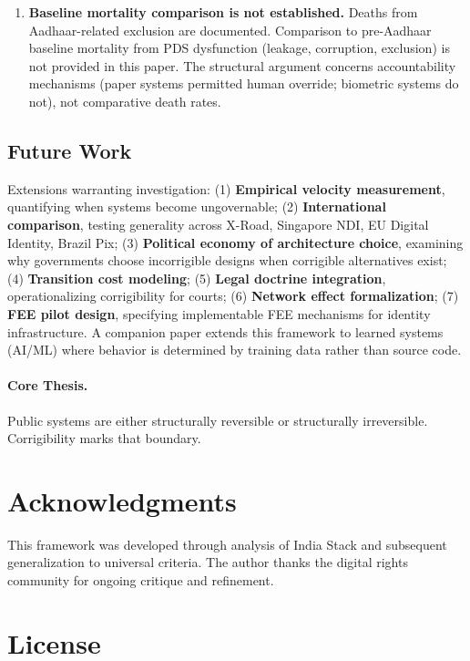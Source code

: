 \documentclass{article}
\begin{document}
\begin{enumerate}
    \item \textbf{Baseline mortality comparison is not established.} Deaths from Aadhaar-related exclusion are documented. Comparison to pre-Aadhaar baseline mortality from PDS dysfunction (leakage, corruption, exclusion) is not provided in this paper. The structural argument concerns accountability mechanisms (paper systems permitted human override; biometric systems do not), not comparative death rates.
\end{enumerate}

\subsection{Future Work}

Extensions warranting investigation: (1) \textbf{Empirical velocity measurement}, quantifying when systems become ungovernable; (2) \textbf{International comparison}, testing generality across X-Road, Singapore NDI, EU Digital Identity, Brazil Pix; (3) \textbf{Political economy of architecture choice}, examining why governments choose incorrigible designs when corrigible alternatives exist; (4) \textbf{Transition cost modeling}; (5) \textbf{Legal doctrine integration}, operationalizing corrigibility for courts; (6) \textbf{Network effect formalization}; (7) \textbf{FEE pilot design}, specifying implementable FEE mechanisms for identity infrastructure. A companion paper extends this framework to learned systems (AI/ML) where behavior is determined by training data rather than source code.

\paragraph{Core Thesis.} Public systems are either structurally reversible or structurally irreversible. Corrigibility marks that boundary.

\section*{Acknowledgments}

This framework was developed through analysis of India Stack and subsequent generalization to universal criteria. The author thanks the digital rights community for ongoing critique and refinement.

\section*{License}
\end{document}
